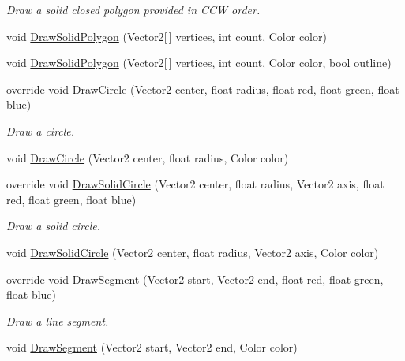 \begin{DoxyCompactItemize}
\begin{DoxyCompactList}\small\item\em Draw a solid closed polygon provided in C\+C\+W order. \end{DoxyCompactList}\item 
void \hyperlink{class_farseer_physics_1_1_debug_views_1_1_debug_view_x_n_a_a3b3c347d3627434242e7ce44fcc7f2ce}{Draw\+Solid\+Polygon} (Vector2\mbox{[}$\,$\mbox{]} vertices, int count, Color color)
\item 
void \hyperlink{class_farseer_physics_1_1_debug_views_1_1_debug_view_x_n_a_ac4b6e7f661fe256ff23bde0ec1a14713}{Draw\+Solid\+Polygon} (Vector2\mbox{[}$\,$\mbox{]} vertices, int count, Color color, bool outline)
\item 
override void \hyperlink{class_farseer_physics_1_1_debug_views_1_1_debug_view_x_n_a_a75984f74bf9524308af106ab6bfae7c3}{Draw\+Circle} (Vector2 center, float radius, float red, float green, float blue)
\begin{DoxyCompactList}\small\item\em Draw a circle. \end{DoxyCompactList}\item 
void \hyperlink{class_farseer_physics_1_1_debug_views_1_1_debug_view_x_n_a_a07047258137750530ae4fcc846d76eaf}{Draw\+Circle} (Vector2 center, float radius, Color color)
\item 
override void \hyperlink{class_farseer_physics_1_1_debug_views_1_1_debug_view_x_n_a_a42566b0b92bb6d2cca381ffedda3f43c}{Draw\+Solid\+Circle} (Vector2 center, float radius, Vector2 axis, float red, float green, float blue)
\begin{DoxyCompactList}\small\item\em Draw a solid circle. \end{DoxyCompactList}\item 
void \hyperlink{class_farseer_physics_1_1_debug_views_1_1_debug_view_x_n_a_a5b0bd4073a7b53e28efdd962b6510dda}{Draw\+Solid\+Circle} (Vector2 center, float radius, Vector2 axis, Color color)
\item 
override void \hyperlink{class_farseer_physics_1_1_debug_views_1_1_debug_view_x_n_a_a2dc50b1a908147503be02c62637b7c42}{Draw\+Segment} (Vector2 start, Vector2 end, float red, float green, float blue)
\begin{DoxyCompactList}\small\item\em Draw a line segment. \end{DoxyCompactList}\item 
void \hyperlink{class_farseer_physics_1_1_debug_views_1_1_debug_view_x_n_a_a496ada28f2546d12afc07bec12119141}{Draw\+Segment} (Vector2 start, Vector2 end, Color color)

\end{DoxyCompactItemize}
